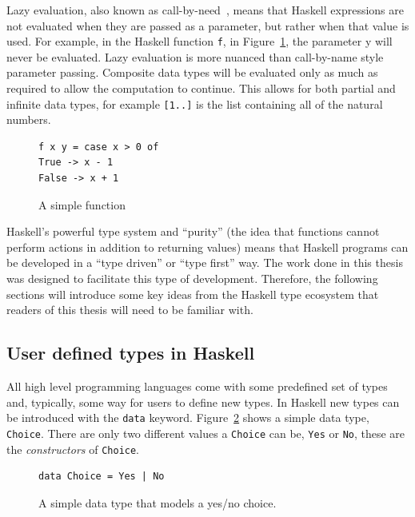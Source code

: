 Lazy evaluation, also known as call-by-need~\citep{wadsworth}, means that Haskell expressions are not evaluated when they are passed as a parameter, but rather when that value is used. For example, in the Haskell function \texttt{f}, in Figure~\ref{lazyY}, the parameter y will never be evaluated. Lazy evaluation is more nuanced than call-by-name style parameter passing. Composite data types will be evaluated only as much as required to allow the computation to continue. This allows for both partial and infinite data types, for example \texttt{[1..]} is the list containing all of the natural numbers. 

\begin{figure}[t]
\begin{lstlisting}
f x y = case x > 0 of
True -> x - 1
False -> x + 1
\end{lstlisting}
\caption{A simple function}
\label{lazyY}
\end{figure}

Haskell's powerful type system and ``purity'' (the idea that functions cannot perform actions in addition to returning values) means that Haskell programs can be developed in a ``type driven'' or ``type first'' way. The work done in this thesis was designed to facilitate this type of development. Therefore, the following sections will introduce some key ideas from the Haskell type ecosystem that readers of this thesis will need to be familiar with.

\subsection{User defined types in Haskell}

All high level programming languages come with some predefined set of types and, typically, some way for users to define new types. In Haskell new types can be introduced with the \texttt{data} keyword. Figure~\ref{simpleDataTy} shows a simple data type, \texttt{Choice}. There are only two different values a \texttt{Choice} can be, \texttt{Yes} or \texttt{No}, these are the \textit{constructors} of \texttt{Choice}. 



\begin{figure}[t]
\begin{lstlisting}
data Choice = Yes | No
\end{lstlisting}
\caption{A simple data type that models a yes/no choice.}
\label{simpleDataTy}
\end{figure}

